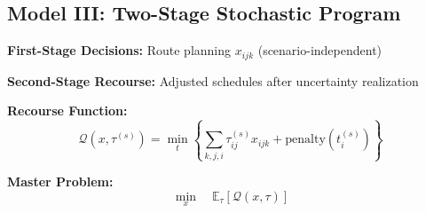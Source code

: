 \subsection{Model III: Two-Stage Stochastic Program}

\textbf{First-Stage Decisions:} Route planning $x_{ijk}$ (scenario-independent)

\textbf{Second-Stage Recourse:} Adjusted schedules after uncertainty realization

\textbf{Recourse Function:}
\begin{equation}
\mathcal{Q}(x, \tau^{(s)}) = \min_t \left\{\sum_{k,j,i} \tau_{ij}^{(s)} x_{ijk} + \text{penalty}(t_i^{(s)})\right\}
\end{equation}

\textbf{Master Problem:}
\begin{equation}
\min_x \quad \mathbb{E}_\tau[\mathcal{Q}(x,\tau)]
\end{equation}

\label{sec:models}
